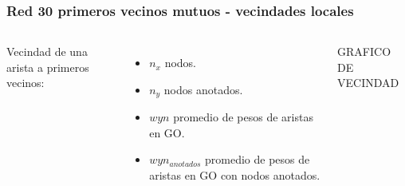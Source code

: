 \documentclass[serif,9pt, t]{beamer}
\begin{document}
\begin{frame}\frametitle{Red 30 primeros vecinos mutuos - vecindades locales} 
\bigskip
\begin{columns}[T]
	Vecindad de una arista a primeros vecinos:
	\bigskip
	\begin{itemize}
	\item $n_x$ nodos.
	\item $n_y$ nodos anotados.
	\item $wyn$ promedio de pesos de aristas en GO.
	\item $wyn_{anotados}$ promedio de pesos de aristas en GO con nodos anotados.	
	\end{itemize}
    \centering
    \bigskip
    GRAFICO DE VECINDAD
\end{columns}
\end{frame}
\end{document}
